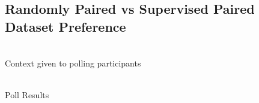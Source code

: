 \documentclass[twoside,english,notitlepage]{report}
\begin{document}
\subsection{Randomly Paired vs Supervised Paired Dataset Preference}
\begin{minipage}[t]{.5\textwidth}\label{fig:survey}
    \centering
    \\Context given to polling participants
\end{minipage}
\begin{minipage}[t]{.5\textwidth}
    \centering
    \\Poll Results
\end{minipage}
\end{document}
